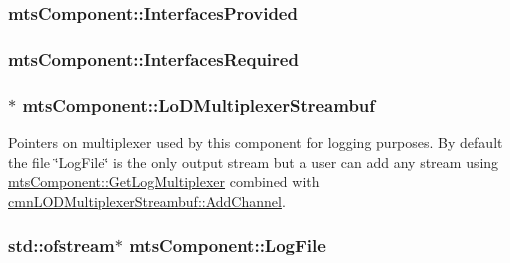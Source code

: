 \hypertarget{classmts_component_ae8842384f42ea5f46b1f39c3e8eddb36}{
\subsubsection[{Interfaces\-Provided}]{ mts\-Component\-::\-Interfaces\-Provided\hspace{0.3cm}{\ttfamily [protected]}}}\label{classmts_component_ae8842384f42ea5f46b1f39c3e8eddb36}
\hypertarget{classmts_component_a41da426dbdbe602272c9ab0d8958bfd4}{
\subsubsection[{Interfaces\-Required}]{ mts\-Component\-::\-Interfaces\-Required\hspace{0.3cm}{\ttfamily [protected]}}}\label{classmts_component_a41da426dbdbe602272c9ab0d8958bfd4}
\hypertarget{classmts_component_a870d5405720c2b9fc95223a1723712fd}{
\subsubsection[{Lo\-D\-Multiplexer\-Streambuf}]{$\ast$ mts\-Component\-::\-Lo\-D\-Multiplexer\-Streambuf\hspace{0.3cm}{\ttfamily [protected]}}}\label{classmts_component_a870d5405720c2b9fc95223a1723712fd}
Pointers on multiplexer used by this component for logging purposes. By default the file \char`\"{}\-Log\-File\char`\"{} is the only output stream but a user can add any stream using \hyperlink{classmts_component_a368c7115c8d9533d634077b2d76af18b}{mts\-Component\-::\-Get\-Log\-Multiplexer} combined with \hyperlink{classcmn_l_o_d_multiplexer_streambuf_a13062543394fee2e08419f0ecad3b5c1}{cmn\-L\-O\-D\-Multiplexer\-Streambuf\-::\-Add\-Channel}. \hypertarget{classmts_component_a5174cc0d7c4802fb479c0d065b79052f}{
\subsubsection[{Log\-File}]{\setlength{\rightskip}{0pt plus 5cm}std\-::ofstream$\ast$ mts\-Component\-::\-Log\-File\hspace{0.3cm}{\ttfamily [protected]}}}\label{classmts_component_a5174cc0d7c4802fb479c0d065b79052f}
